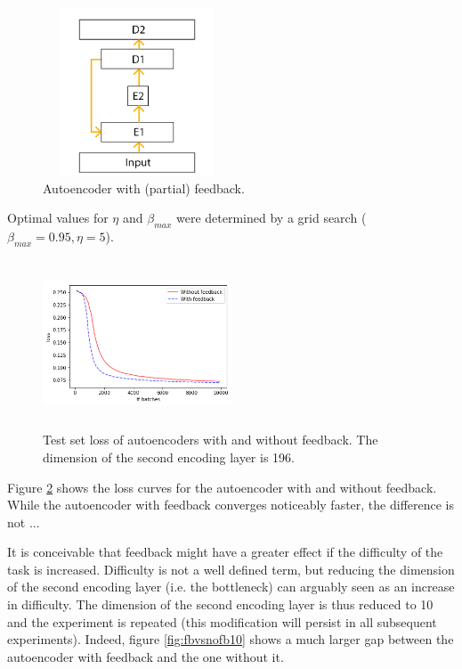 \documentclass{article}
\begin{document}
\begin{figure}
      \centering
      \includegraphics[width=0.5\textwidth,height=5cm,keepaspectratio]{img/AutoEnc.png}
      \caption{Autoencoder with (partial) feedback.}
      \label{fig:autoenc}
  \end{figure}
  
Optimal values for $\eta$ and $\beta_{max}$ were determined by a grid search ($\beta_{max}=0.95, \eta=5$).
 \begin{figure}
      \centering
      \includegraphics[width=0.5\textwidth,height=5cm,keepaspectratio]{img/mnist196test.png}
      \caption{Test set loss of autoencoders with and without feedback. The dimension of the second encoding layer is 196. }
      \label{fig:fbvsnofb}
  \end{figure}
  
Figure \ref{fig:fbvsnofb} shows the loss curves for the autoencoder with and without feedback. While the autoencoder with feedback converges noticeably faster, the difference is not ... 

It is conceivable that feedback might have a greater effect if the difficulty of the task is increased. Difficulty is not a well defined term, but reducing the dimension of the second encoding layer (i.e. the bottleneck) can arguably seen as an increase in difficulty. 
The dimension of the second encoding layer is thus reduced to 10 and the experiment is repeated (this modification will persist in all subsequent experiments). Indeed, figure \ref{fig:fbvsnofb10} shows a much larger gap between the autoencoder with feedback and the one without it. 
\end{document}
